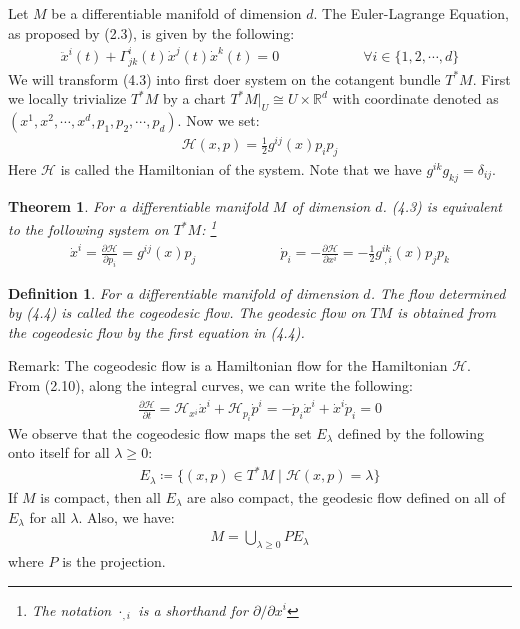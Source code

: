 \documentclass[11pt]{book}
\theoremstyle{break}
\theoremstyle{break}
\newtheorem{thm}{Theorem}[section]
\newtheorem{defn}{Definition}[corL]
\newcommand{\R}{\mathbb{R}}
\newcommand{\pd}{\partial}
\newcommand{\remark}{\color{blue}Remark: \color{black}}
\begin{document}
Let $M$ be a differentiable manifold of dimension $d$. The Euler-Lagrange Equation, as proposed by (2.3), is given by the following:
\begin{align}
\ddot{x}^i(t) + \Gamma_{jk}^i (t) \dot{x}^j(t) \dot{ x}^k(t) = 0 \qquad\qquad\qquad \forall i\in\{1,2,\cdots,d\}
\end{align}
We will transform (4.3) into first doer system on the cotangent bundle $T^*M$. First we locally trivialize $T^*M$ by a chart $T^*M|_U \cong U \times \R^d$ with coordinate denoted as $(x^1,x^2,\cdots, x^d, p_1,p_2,\cdots,p_d)$. Now we set:
\begin{align*}
\mathcal{H}(x,p) = \frac{1}{2}g^{ij}(x) p_ip_j
\end{align*}
Here $\mathcal{H}$ is called the Hamiltonian of the system. Note that we have $g^{ik}g_{kj} = \delta_{ij}$.\\

\begin{thm}
For a differentiable manifold $M$ of dimension $d$. (4.3) is equivalent to the following system on $T^*M$: \footnote{The notation $\cdot_{,i}$ is a shorthand for $\pd/\pd x^i$}
\begin{align}
\dot{x}^i = \frac{\pd \mathcal{H}}{\pd p_i} = g^{ij}(x) p_j \qquad\qquad\qquad
\dot{p}_i = -\frac{\pd \mathcal{H}}{\pd x^i} = -\frac{1}{2}g^{ik}_{\ ,i}(x) p_j p_k
\end{align}
\end{thm}

\begin{defn}
For a differentiable manifold of dimension $d$. The flow determined by (4.4) is called the cogeodesic flow. The geodesic flow on $TM$ is obtained from the cogeodesic flow by the first equation in (4.4).
\end{defn}

\remark The cogeodesic flow is a Hamiltonian flow for the Hamiltonian $\mathcal{H}$. \\

From (2.10), along the integral curves, we can write the following:
\begin{align*}
\frac{\pd \mathcal{H}}{\pd t} = \mathcal{H}_{x^i}\dot{x}^i + \mathcal{H}_{p_i}\dot{p}^i = -\dot{p}_i \dot{x}^i + \dot{x}^i\dot{p}_i =0
\end{align*}
We observe that the cogeodesic flow maps the set $E_\lambda$ defined by the following onto itself for all $\lambda \geq 0$:
\begin{align*}
E_\lambda \coloneqq \{(x,p) \in T^*M \mid \mathcal{H}(x, p) = \lambda \}
\end{align*}
If $M$ is compact, then all $E_\lambda$ are also compact, the geodesic flow defined on all of $E_\lambda$ for all $\lambda$. Also, we have:
\begin{align*}
M = \bigcup_{\lambda \geq 0}PE_\lambda
\end{align*}
where $P$ is the projection. \\
\end{document}
